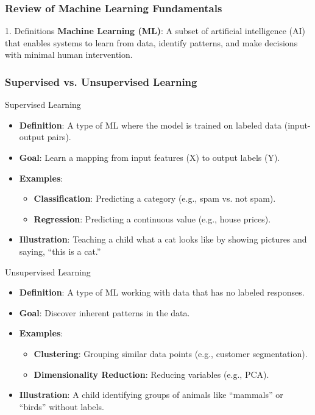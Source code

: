 \documentclass[aspectratio=169]{beamer}
\begin{document}
\begin{frame}[fragile]
  \frametitle{Review of Machine Learning Fundamentals}
  \begin{block}{1. Definitions}
    \textbf{Machine Learning (ML)}: A subset of artificial intelligence (AI) that enables systems to learn from data, identify patterns, and make decisions with minimal human intervention.
  \end{block}
\end{frame}

\begin{frame}[fragile]
  \frametitle{Supervised vs. Unsupervised Learning}
  \begin{block}{Supervised Learning}
    \begin{itemize}
      \item \textbf{Definition}: A type of ML where the model is trained on labeled data (input-output pairs).
      \item \textbf{Goal}: Learn a mapping from input features (X) to output labels (Y).
      \item \textbf{Examples}:
        \begin{itemize}
          \item \textbf{Classification}: Predicting a category (e.g., spam vs. not spam).
          \item \textbf{Regression}: Predicting a continuous value (e.g., house prices).
        \end{itemize}
      \item \textbf{Illustration}: Teaching a child what a cat looks like by showing pictures and saying, “this is a cat.”
    \end{itemize}
  \end{block}
  
  \begin{block}{Unsupervised Learning}
    \begin{itemize}
      \item \textbf{Definition}: A type of ML working with data that has no labeled responses.
      \item \textbf{Goal}: Discover inherent patterns in the data.
      \item \textbf{Examples}:
        \begin{itemize}
          \item \textbf{Clustering}: Grouping similar data points (e.g., customer segmentation).
          \item \textbf{Dimensionality Reduction}: Reducing variables (e.g., PCA).
        \end{itemize}
      \item \textbf{Illustration}: A child identifying groups of animals like “mammals” or “birds” without labels.
    \end{itemize}
  \end{block}
\end{frame}
\end{document}
